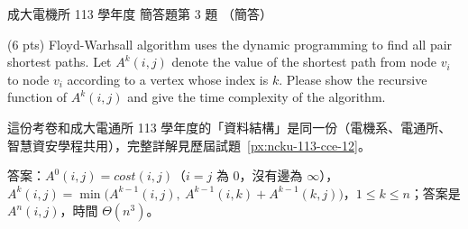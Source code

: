\begin{pastexam}[label={px:ncku-113-ee-12}]{成大電機所 113 學年度 簡答題第 3 題}
（簡答）

(6 pts) Floyd-Warhsall algorithm uses the dynamic programming to find all pair shortest paths.
Let $A^k(i,j)$ denote the value of the shortest path from node $v_i$ to node $v_i$ according to
a vertex whose index is $k$. Please show the recursive function of $A^k(i,j)$ and give the time
complexity of the algorithm.
\end{pastexam}

\begin{pastsoln}
這份考卷和成大電通所 113 學年度的「資料結構」是同一份（電機系、電通所、智慧資安學程共用），完整詳解見歷屆試題~\ref{px:ncku-113-cce-12}。

答案：$A^0(i, j) = \mathit{cost}(i, j)$（$i = j$ 為 $0$，沒有邊為 $\infty$），
$A^k(i, j) = \min\bigl(A^{k-1}(i, j),\ A^{k-1}(i, k) + A^{k-1}(k, j)\bigr)$，$1 \le k \le n$；答案是 $A^n(i, j)$，時間 $\Theta(n^3)$。
\end{pastsoln}
